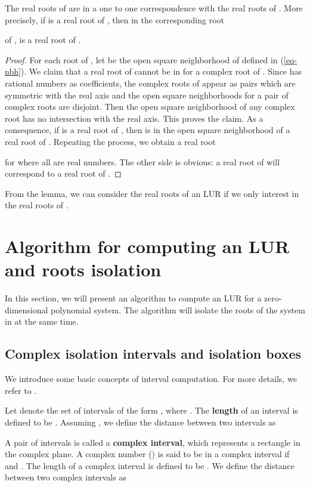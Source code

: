 \documentclass[amsthm]{JSC_LaTex_2007_Mar_12/elsart}
\def\bref#1{(\ref{#1})}
\begin{document}
\begin{cor}
The real roots of  are in  a one to one correspondence with
the real roots of . More precisely, if  is a
real root of , then in the corresponding root

of ,  is a real root of .
\end{cor}
\begin{proof}
For each root  of , let   be
the open square neighborhood of  defined in \bref{eq-nbh}.
We claim that a real root of  cannot be in
 for a complex root  of .
Since  has rational numbers as coefficients, the complex
roots of  appear as pairs which are symmetric with the
real axis and the open square neighborhoods for a pair of complex
roots are disjoint. Then the open square neighborhood of any complex
root has no intersection with the real axis. This proves the claim.
As a consequence, if  is a real root of , then
 is in the open square neighborhood of a real root
 of . Repeating the process, we obtain a
real root

for  where all  are real numbers.
The other side is obvious: a real root of  will correspond to
a real root of .
\end{proof}
From the lemma, we can consider the real roots of an LUR if we only
interest in the real roots of .


\section{Algorithm for computing an LUR and roots isolation}
In this section, we will present an algorithm to compute an LUR for
a zero-dimensional polynomial system. The algorithm will isolate the
roots of the system in  at the same time.


\subsection{Complex isolation intervals and isolation boxes}
We introduce some basic concepts of interval computation. For more
details, we refer to \cite{intervalbook}.

Let  denote the set of intervals of the form ,
where . The {\bf length} of an interval  is defined to be .
Assuming , we define the distance between two intervals
as


A pair of intervals   is called a {\bf complex
interval}, which represents a rectangle in the complex plane. A
complex number  () is said to be in a complex
interval  if  and  .
 The length of a complex interval  is defined to
be .
We define the distance between two complex intervals as {\small
}
\end{document}

